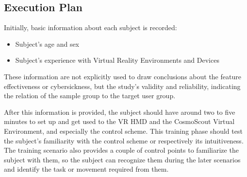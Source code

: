 \subsection{Execution Plan}\label{subsec:execution-plan}

Initially, basic information about each subject is recorded:
\begin{itemize}
    \item Subject's age and sex
    \item Subject's experience with Virtual Reality Environments and Devices
\end{itemize}
These information are not explicitly used to draw conclusions about the feature effectiveness or cybersickness, but
the study's validity and reliability, indicating the relation of the sample group to the target user group.

After this information is provided, the subject should have around two to five minutes to set up and get used to the
VR HMD and the CosmoScout Virtual Environment, and especially the control scheme.
This training phase should test the subject's familiarity with the control scheme or respectively its intuitiveness.
The training scenario also provides a couple of control points to familiarize the subject with them, so the subject
can recognize them during the later scenarios and identify the task or movement required from them.

